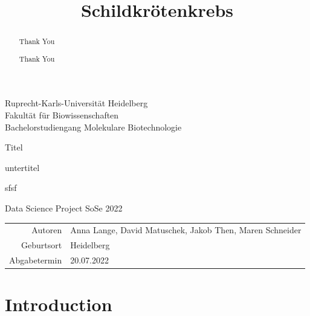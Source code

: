 \documentclass[
  parskip,
  oneside]{scrreprt}
\title{Schildkrötenkrebs}
\author{}
\date{\vspace{-2.5em}}
\begin{document}
\maketitle

\begin{titlepage}
\centering
    {\Large Ruprecht-Karls-Universität Heidelberg\\
        Fakultät für Biowissenschaften\\
        Bachelorstudiengang Molekulare Biotechnologie\\}

    {}
    {

        {\Huge Titel}

        {\Huge untertitel}

        {\Huge sfsf}

    }

    {\Large Data Science Project SoSe 2022}


    {\Large
        \begin{tabular}{rl}
            Autoren & Anna Lange, David Matuschek, Jakob Then, Maren Schneider\\
            Geburtsort & Heidelberg\\
            Abgabetermin &20.07.2022\\
        \end{tabular}
    }


\end{titlepage}

\tableofcontents

\renewcommand\abstractname{\Large Acknowledgments}
\begin{abstract}
Thank You
\end{abstract}

\renewcommand\abstractname{\Large Abstract}
\begin{abstract}
Thank You
\end{abstract}

\hypertarget{introduction}{%
\chapter{Introduction}\label{introduction}}
\end{document}
